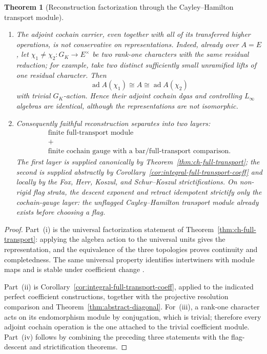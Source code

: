 \documentclass[11pt]{article}
\newtheorem{theorem}{Theorem}[section]
\theoremstyle{definition}
\begin{document}
\begin{theorem}[Reconstruction factorization through the Cayley--Hamilton transport module]
\begin{enumerate}[label=\textnormal{(\roman*)}]
\item The adjoint cochain carrier, even together with all of its transferred
higher operations, is not conservative on representations.  Indeed, already over $A=E$, let
$\chi_1\ne\chi_2:G_K\to E^\times$ be two rank-one characters with the same
residual reduction; for example, take two distinct sufficiently small
unramified lifts of one residual character.  Then
\begin{equation}\label{eq:rankone-adjoint-nonreconstruction}
 \operatorname{ad}A(\chi_1)
 \cong A
 \cong \operatorname{ad}A(\chi_2)
\end{equation}
with trivial $G_K$-action.  Hence their adjoint cochain dgas and controlling
$L_\infty$ algebras are identical, although the representations are not
isomorphic.

\item Consequently faithful reconstruction separates into two layers:
\begin{equation}\label{eq:two-layer-reconstruction}
\begin{gathered}
 \boxed{\text{finite full-transport module}}\\
 {}+{}\\
 \boxed{\text{finite cochain gauge with a bar/full-transport comparison}}.
\end{gathered}
\end{equation}
The first layer is supplied canonically by
Theorem~\ref{thm:ch-full-transport}; the second is supplied abstractly by
Corollary~\ref{cor:integral-full-transport-coeff} and locally by the Fox,
Herr, Koszul, and Schur--Koszul strictifications.  On non-rigid flag strata,
the descent exponent and retract idempotent strictify only the cochain-gauge
layer: the unflagged Cayley--Hamilton transport module already exists before
choosing a flag.
\end{enumerate}
\end{theorem}

\begin{proof}
Part~(i) is the universal factorization statement of
Theorem~\ref{thm:ch-full-transport}: applying the algebra action to the
universal units gives the representation, and the equivalence of the three
topologies proves continuity and completedness.  The same universal property
identifies intertwiners with module maps and is stable under coefficient
change \cite{WangEricksonFamilies,ChenevierDeterminants}.

Part~(ii) is Corollary~\ref{cor:integral-full-transport-coeff}, applied to the
indicated perfect coefficient constructions, together with the projective
resolution comparison and Theorem~\ref{thm:abstract-diagonal}.  For~(iii), a
rank-one character acts on its endomorphism module by conjugation, which is
trivial; therefore every adjoint cochain operation is the one attached to the
trivial coefficient module.  Part~(iv) follows by combining the preceding
three statements with the flag-descent and strictification theorems.
\end{proof}
\end{document}
